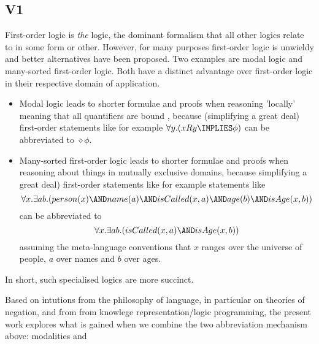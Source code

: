 \subsection{V1}

First-order logic is \emph{the} logic, the dominant formalism that all
other logics relate to in some form or other. However, for many
purposes first-order logic is unwieldy and better alternatives have
been proposed. Two examples are modal logic and many-sorted
first-order logic.  Both have a distinct advantage over first-order
logic in their respective domain of application.

\begin{itemize}

\item Modal logic leads to shorter formulae and proofs when 
reasoning 'locally' meaning that all quantifiers are
bound \cite{BlackburnP:modlog}, because (simplifying a great deal)
first-order statements like for example $\forall y. ( x R
y \IMPLIES \phi)$ can be abbreviated to $\diamond \phi$.

\item Many-sorted first-order logic leads to shorter 
formulae and proofs when reasoning about things in mutually exclusive
domains, because simplifying a great deal)
first-order statements like for example statements like
\[
     \forall x. \exists ab.( person(x) \AND name (a) \AND isCalled( x, a ) \AND age(b) \AND isAge(x,b))
\]
can be abbreviated to
\[
     \forall x. \exists ab.( isCalled( x, a ) \AND isAge(x,b))
\]
assuming the meta-language conventions that $x$ ranges over the
universe of people, $a$ over names and $b$ over ages.

\end{itemize}

\NI In short, such specialised logics   are more succinct.  

Based on intutions from the philosophy of language, in particular on
theories of negation, and from from knowlege representation/logic
programming, the present work explores what is gained when we combine
the two abbreviation mechanism above: modalities and



